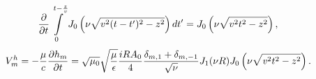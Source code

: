 %
\begin{equation*} \begin{aligned}
\frac{\partial }{\partial t} \int \limits_{0}^{t - \frac{z}{v}} 
J_0 \left( \nu \sqrt{v^2 (t-t')^2 - z^2} \right) dt' =
J_0 \left( \nu \sqrt{v^2 t^2 - z^2} \right),
\end{aligned} \end{equation*}
%
\textcolor{blue} { \begin{equation*} \begin{aligned}
V_m^h = - \frac{\mu}{c} \frac{\partial h_m}{\partial t} = 
\sqrt{\mu_0} \sqrt{\frac{\mu}{\epsilon}} \frac{iR A_0}{4} 
\frac{\delta_{m,1} + \delta_{m,-1}}{\sqrt{\nu}} J_1 (\nu R)
J_0 \left( \nu \sqrt{\mathit{v}^2 t^2 - z^2} \right).
\end{aligned} \end{equation*} }

